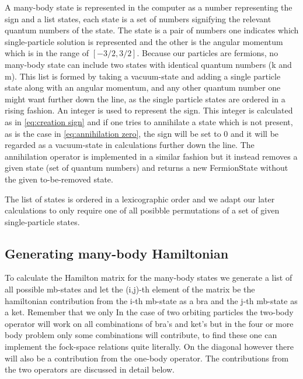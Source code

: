 A many-body state is represented in the computer as a number representing the sign and a list states, each state is a set of numbers signifying the relevant quantum numbers of the state.
 The state is a pair of numbers one indicates which single-particle solution is represented and the other is the angular momentum which is in the range of $[-3/2,3/2]$.
 Because our particles are fermions, no many-body state can include two states with identical quantum numbers (k and m).
 This list is formed by taking a vacuum-state and adding a single particle state along with an angular momentum, and any other quantum number one might want further down the line, as the single particle states are ordered in a rising fashion. An integer is used to represent the sign. 
 This integer is calculated as in \ref{eq:creation sign} and if one tries to annihilate a state which is not present, as is the case in \ref{eq:annihilation zero}, the sign will be set to 0 and it will be regarded as a vacuum-state in calculations further down the line.
 The annihilation operator is implemented in a similar fashion but it instead removes a given state (set of quantum numbers) and returns a new FermionState without the given to-be-removed state.
 
 The list of states is ordered in a lexicographic order and we adapt our later calculations to only require one of all posibble permutations of a set of given single-particle states.
 
 
\subsection{Generating many-body Hamiltonian}
To calculate the Hamilton matrix for the many-body states we generate a list of all possible mb-states and let the (i,j)-th element of the matrix be the hamiltonian contribution from the i-th mb-state as a bra and the j-th mb-state as a ket. 
 Remember that we only 
 In the case of two  orbiting particles the two-body operator will work on all combinations of bra's and ket's but in the four or more body problem only some combinations will contribute, to find these one can implement the fock-space relations quite literally. 
 On the diagonal however there will also be a contribution from the one-body operator.
 The contributions from the two operators are discussed in detail below.

